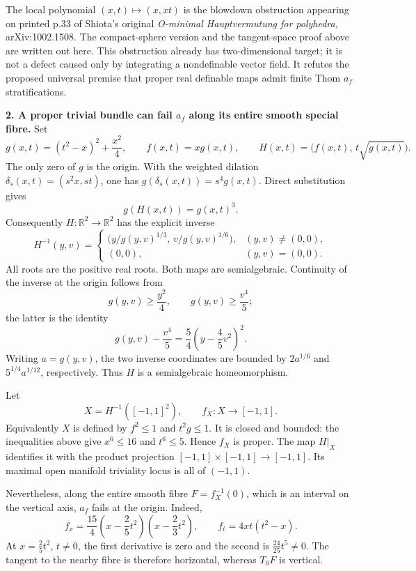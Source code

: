 The local polynomial \((x,t)\mapsto(x,xt)\) is the blowdown obstruction
appearing on printed p.33 of Shiota's original
\emph{O-minimal Hauptvermutung for polyhedra}, arXiv:1002.1508.
The compact-sphere version and the tangent-space proof above are
written out here. This obstruction already has two-dimensional target;
it is not a defect caused only by integrating a nondefinable vector field.
It refutes the proposed universal premise that proper real definable
maps admit finite Thom \(a_f\) stratifications.

\medskip\noindent\textbf{2. A proper trivial bundle can fail \(a_f\)
along its entire smooth special fibre.}
Set
\[
 g(x,t)=(t^2-x)^2+\frac{x^2}{4},\qquad f(x,t)=xg(x,t),
 \qquad
 H(x,t)=\bigl(f(x,t),\,t\sqrt{g(x,t)}\bigr).
\]
The only zero of \(g\) is the origin. With the weighted dilation
\(\delta_s(x,t)=(s^2x,st)\), one has
\(g(\delta_s(x,t))=s^4g(x,t)\). Direct substitution gives
\[
                    g(H(x,t))=g(x,t)^3.
\]
Consequently \(H:\mathbb R^2\to\mathbb R^2\) has the explicit inverse
\[
 H^{-1}(y,v)=
 \begin{cases}
 \bigl(y/g(y,v)^{1/3},\,v/g(y,v)^{1/6}\bigr),&(y,v)\ne(0,0),\\
 (0,0),&(y,v)=(0,0).
 \end{cases}
\]
All roots are the positive real roots. Both maps are semialgebraic.
Continuity of the inverse at the origin follows from
\[
 g(y,v)\ge\frac{y^2}{4},\qquad
 g(y,v)\ge\frac{v^4}{5};
\]
the latter is the identity
\[
 g(y,v)-\frac{v^4}{5}
             =\frac54\left(y-\frac45v^2\right)^2.
\]
Writing \(a=g(y,v)\), the two inverse coordinates are bounded by
\(2a^{1/6}\) and \(5^{1/4}a^{1/12}\), respectively.
Thus \(H\) is a semialgebraic homeomorphism.

Let
\[
 X=H^{-1}([-1,1]^2),\qquad f_X:X\longrightarrow[-1,1].
\]
Equivalently \(X\) is defined by \(f^2\le1\) and \(t^2g\le1\).
It is closed and bounded: the inequalities above give
\(x^6\le16\) and \(t^6\le5\). Hence \(f_X\) is proper.
The map \(H|_X\) identifies it with the product projection
\([-1,1]\times[-1,1]\to[-1,1]\). Its maximal open manifold
triviality locus is all of \((-1,1)\).

Nevertheless, along the entire smooth fibre
\(F=f_X^{-1}(0)\), which is an interval on the vertical axis, \(a_f\)
fails at the origin. Indeed,
\[
 f_x=\frac{15}{4}\left(x-\frac25t^2\right)
                       \left(x-\frac23t^2\right),
 \qquad
 f_t=4xt(t^2-x).
\]
At \(x=\frac25t^2\), \(t\ne0\), the first derivative is zero and
the second is \(\frac{24}{25}t^5\ne0\).
The tangent to the nearby fibre is therefore horizontal,
whereas \(T_0F\) is vertical.

